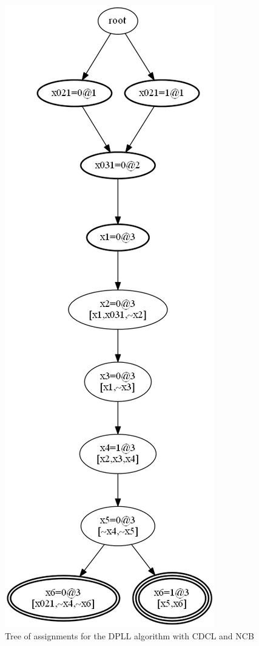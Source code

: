 \documentclass[11pt]{report}
\begin{document}
\begin{figure}
\begin{center}
\includegraphics[keepaspectratio=true,height=.9\textheight]{tree3-bw}
\end{center}
\caption{Tree of assignments for the DPLL algorithm with CDCL and NCB}\label{tree3}
\end{figure}
\end{document}
